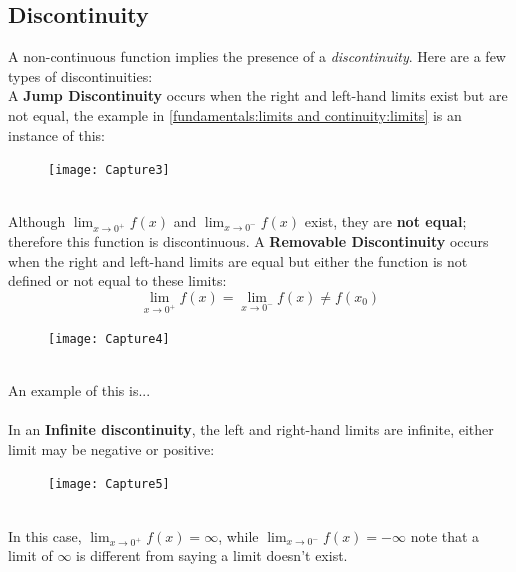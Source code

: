 \documentclass{report}
\begin{document}
\subsection{Discontinuity} %
A non-continuous function implies the presence of a \textit{discontinuity}. Here are a few
types of discontinuities:\\
A \textbf{Jump Discontinuity} occurs when the right and left-hand limits exist but are not equal,
the example in \ref{fundamentals:limits and continuity:limits} is an instance of this:
\begin{figure}[h]
\texttt{[image: Capture3]}
\centering
\end{figure}\\
Although $\lim_{x\to 0^+}f(x)$ and $\lim_{x\to 0^-}f(x)$ exist, they are \textbf{not equal};
therefore this function is discontinuous.
\newpage
\noindent A \textbf{Removable Discontinuity} occurs when the right and left-hand limits are equal but either
the function is not defined or not equal to these limits:
\begin{equation*}
\lim_{x\to 0^+}f(x)=\lim_{x\to 0^-}f(x)\neq f(x_0)
\end{equation*}
\begin{figure}[h]
\texttt{[image: Capture4]}
\centering
{}
\end{figure}\\
An example of this is...%
\\
\vspace{2mm}\\
In an \textbf{Infinite discontinuity}, the left and right-hand limits are infinite,
either limit may be negative or positive:
\begin{figure}[h]
\texttt{[image: Capture5]}
\centering
{}
\end{figure}\\
In this case, $\lim_{x\to 0^+}f(x)=\infty$, while $\lim_{x\to 0^-}f(x)=-\infty$ note that a limit 
of $\infty$ is different from saying a limit doesn't exist.
\newpage
\end{document}

